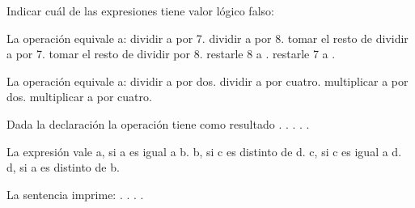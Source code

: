 \begin{preguntas}
\question Indicar cuál de las expresiones tiene valor lógico falso:
\choice {}
\choice {}
\correctchoice {}
\choice {}

\question La operación  equivale a:
\choice dividir a  por 7.
\choice dividir a  por 8.
\choice tomar el resto de dividir a  por 7.
\correctchoice tomar el resto de dividir  por 8.
\choice restarle 8 a .
\choice restarle 7 a .

\question La operación  equivale a:
\choice dividir a  por dos.
\correctchoice dividir a  por cuatro.
\choice multiplicar a  por dos.
\choice multiplicar a  por cuatro.

\question Dada la declaración  la operación  tiene como resultado
.
.
.
.
.

\question La expresión  vale
\choice a, si a es igual a b.
\choice b, si c es distinto de d.
\choice c, si c es igual a d.
\correctchoice d, si a es distinto de b.

\question La sentencia  imprime:
.
.
.
.

\end{preguntas}
